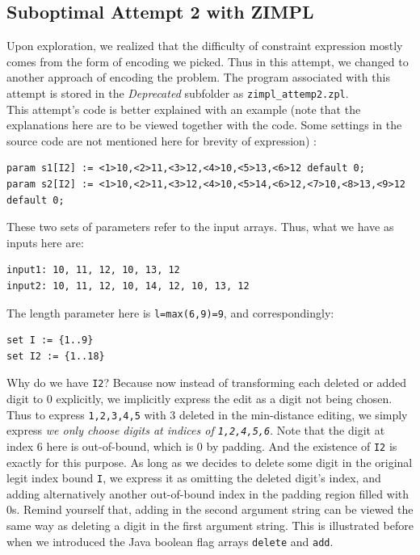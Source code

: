 \documentclass{article}
\begin{document}
\subsection{Suboptimal Attempt 2 with ZIMPL}
Upon exploration, we realized that the difficulty of constraint expression mostly comes from the form of encoding we picked. Thus in this attempt, we changed to another approach of encoding the problem. The program associated with this attempt is stored in the \textit{Deprecated} subfolder as \texttt{zimpl\_attemp2.zpl}. \\

This attempt's code is better explained with an example (note that the explanations here are to be viewed together with the code. Some settings in the source code are not mentioned here for brevity of expression) :
\begin{lstlisting}
param s1[I2] := <1>10,<2>11,<3>12,<4>10,<5>13,<6>12 default 0;
param s2[I2] := <1>10,<2>11,<3>12,<4>10,<5>14,<6>12,<7>10,<8>13,<9>12 default 0;
\end{lstlisting}
These two sets of parameters refer to the input arrays. Thus, what we have as inputs here are:
\begin{lstlisting}
input1: 10, 11, 12, 10, 13, 12
input2: 10, 11, 12, 10, 14, 12, 10, 13, 12
\end{lstlisting}
The length parameter here is \texttt{l=max(6,9)=9}, and correspondingly:
\begin{lstlisting}
set I := {1..9}
set I2 := {1..18}
\end{lstlisting}
Why do we have \texttt{I2}? Because now instead of transforming each deleted or added digit to 0 explicitly, we implicitly express the edit as a digit not being chosen. Thus to express \texttt{1,2,3,4,5} with 3 deleted in the min-distance editing, we simply express \textit{we only choose digits at indices of \texttt{1,2,4,5,6}}. Note that the digit at index 6 here is out-of-bound, which is 0 by padding. And the existence of \texttt{I2} is exactly for this purpose. As long as we decides to delete some digit in the original legit index bound \texttt{I}, we express it as omitting the deleted digit's index, and adding alternatively another out-of-bound index in the padding region filled with 0s. Remind yourself that, adding in the second argument string can be viewed the same way as deleting a digit in the first argument string. This is illustrated before when we introduced the Java boolean flag arrays \texttt{delete} and \texttt{add}.\\
\end{document}
